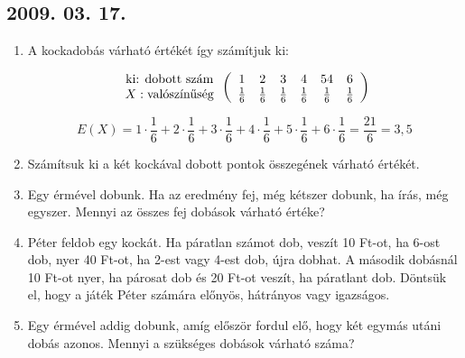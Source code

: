 \documentclass{article}
\begin{document}
\subsection*{2009. 03. 17.}
\begin{enumerate}
\item A kockadobás várható értékét így számítjuk ki: 

$$
\begin{array}{c}
\text{ki: dobott szám}\cr
X:\text{valószínűség}
\end{array}
\left(
\begin{array}{cccccc}
1&2&3&4&54&6\cr
\frac{1}{6}&
\frac{1}{6}&
\frac{1}{6}&
\frac{1}{6}&
\frac{1}{6}&
\frac{1}{6}
\end{array}
\right)
$$

$$
E(X)=
1\cdot\frac{1}{6}+
2\cdot\frac{1}{6}+
3\cdot\frac{1}{6}+
4\cdot\frac{1}{6}+
5\cdot\frac{1}{6}+
6\cdot\frac{1}{6}=
\frac{21}{6}=3{,}5
$$








\item Számítsuk ki a két kockával dobott pontok összegének várható értékét.

\item Egy érmével dobunk. Ha az eredmény fej, még kétszer dobunk, ha írás, még egyszer. Mennyi az összes fej dobások várható értéke?

\item Péter feldob egy kockát. Ha páratlan számot dob, veszít 10 Ft-ot, ha 6-ost dob, nyer 40 Ft-ot, ha 2-est vagy 4-est dob, újra dobhat. A második dobásnál 10 Ft-ot nyer, ha párosat dob és 20 Ft-ot veszít, ha páratlant dob. Döntsük el, hogy a játék Péter számára előnyös, hátrányos vagy igazságos.

\item Egy érmével addig dobunk, amíg először fordul elő, hogy két egymás utáni dobás azonos. Mennyi a szükséges dobások várható száma?
\end{enumerate}
\end{document}
